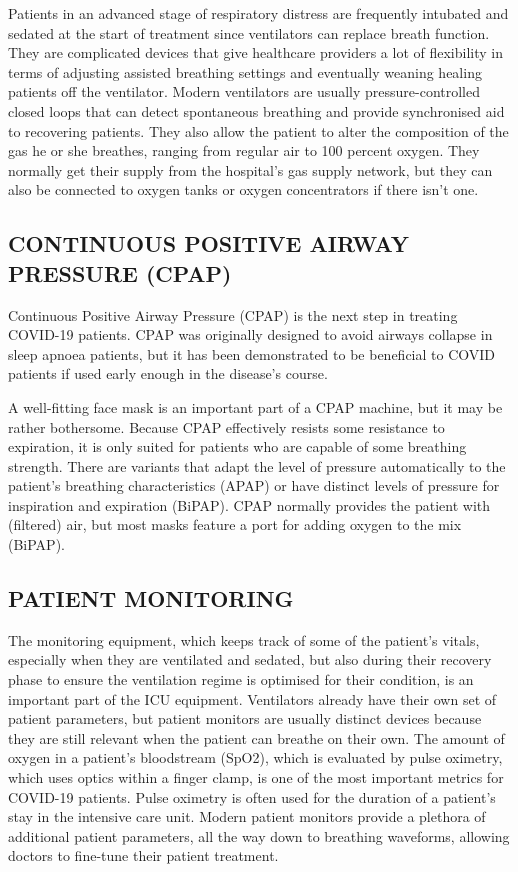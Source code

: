 \documentclass{article}
\begin{document}
Patients in an advanced stage of respiratory distress are frequently intubated and sedated at the start of treatment since ventilators can replace breath function.
They are complicated devices that give healthcare providers a lot of flexibility in terms of adjusting assisted breathing settings and eventually weaning healing patients off the ventilator.
Modern ventilators are usually pressure-controlled closed loops that can detect spontaneous breathing and provide synchronised aid to recovering patients.
They also allow the patient to alter the composition of the gas he or she breathes, ranging from regular air to 100 percent oxygen. They normally get their supply from the hospital's gas supply network, but they can also be connected to oxygen tanks or oxygen concentrators if there isn't one.

\subsection{CONTINUOUS POSITIVE AIRWAY PRESSURE (CPAP)}

Continuous Positive Airway Pressure (CPAP) is the next step in treating COVID-19 patients. CPAP was originally designed to avoid airways collapse in sleep apnoea patients, but it has been demonstrated to be beneficial to COVID patients if used early enough in the disease's course.


A well-fitting face mask is an important part of a CPAP machine, but it may be rather bothersome.
Because CPAP effectively resists some resistance to expiration, it is only suited for patients who are capable of some breathing strength.
There are variants that adapt the level of pressure automatically to the patient's breathing characteristics (APAP) or have distinct levels of pressure for inspiration and expiration (BiPAP). CPAP normally provides the patient with (filtered) air, but most masks feature a port for adding oxygen to the mix (BiPAP).

\subsection{PATIENT MONITORING}

The monitoring equipment, which keeps track of some of the patient's vitals, especially when they are ventilated and sedated, but also during their recovery phase to ensure the ventilation regime is optimised for their condition, is an important part of the ICU equipment.
Ventilators already have their own set of patient parameters, but patient monitors are usually distinct devices because they are still relevant when the patient can breathe on their own.
The amount of oxygen in a patient's bloodstream (SpO2), which is evaluated by pulse oximetry, which uses optics within a finger clamp, is one of the most important metrics for COVID-19 patients.
Pulse oximetry is often used for the duration of a patient's stay in the intensive care unit.
Modern patient monitors provide a plethora of additional patient parameters, all the way down to breathing waveforms, allowing doctors to fine-tune their patient treatment.
\end{document}
